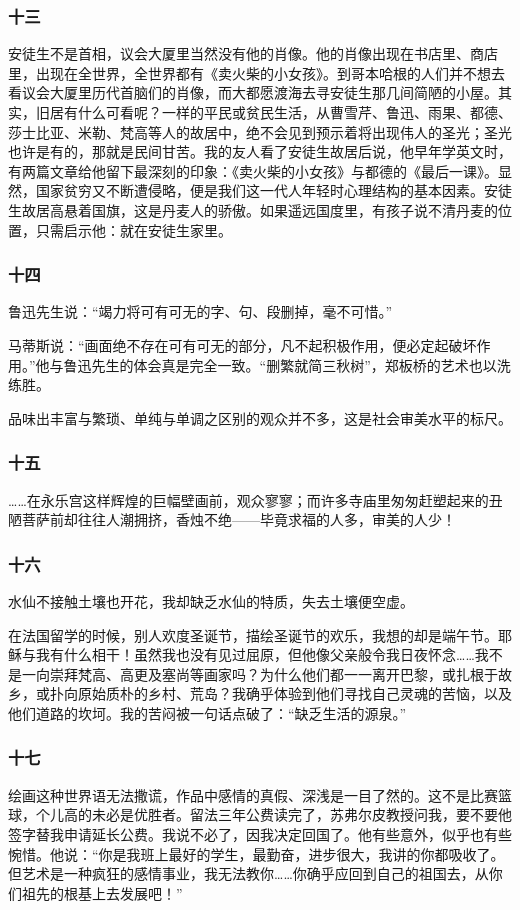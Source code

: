 \documentclass{article}
\begin{document}
\subsubsection{十三}
安徒生不是首相，议会大厦里当然没有他的肖像。他的肖像出现在书店里、商店里，出现在全世界，全世界都有《卖火柴的小女孩》。到哥本哈根的人们并不想去看议会大厦里历代首脑们的肖像，而大都愿渡海去寻安徒生那几间简陋的小屋。其实，旧居有什么可看呢？一样的平民或贫民生活，从曹雪芹、鲁迅、雨果、都德、莎士比亚、米勒、梵高等人的故居中，绝不会见到预示着将出现伟人的圣光；圣光也许是有的，那就是民间甘苦。我的友人看了安徒生故居后说，他早年学英文时，有两篇文章给他留下最深刻的印象：《卖火柴的小女孩》与都德的《最后一课》。显然，国家贫穷又不断遭侵略，便是我们这一代人年轻时心理结构的基本因素。安徒生故居高悬着国旗，这是丹麦人的骄傲。如果遥远国度里，有孩子说不清丹麦的位置，只需启示他：就在安徒生家里。
\subsubsection{十四}
鲁迅先生说：“竭力将可有可无的字、句、段删掉，毫不可惜。”

马蒂斯说：“画面绝不存在可有可无的部分，凡不起积极作用，便必定起破坏作用。”他与鲁迅先生的体会真是完全一致。“删繁就简三秋树”，郑板桥的艺术也以洗练胜。

品味出丰富与繁琐、单纯与单调之区别的观众并不多，这是社会审美水平的标尺。
\subsubsection{十五}
……在永乐宫这样辉煌的巨幅壁画前，观众寥寥；而许多寺庙里匆匆赶塑起来的丑陋菩萨前却往往人潮拥挤，香烛不绝——毕竟求福的人多，审美的人少！
\subsubsection{十六}
水仙不接触土壤也开花，我却缺乏水仙的特质，失去土壤便空虚。

在法国留学的时候，别人欢度圣诞节，描绘圣诞节的欢乐，我想的却是端午节。耶稣与我有什么相干！虽然我也没有见过屈原，但他像父亲般令我日夜怀念……我不是一向崇拜梵高、高更及塞尚等画家吗？为什么他们都一一离开巴黎，或扎根于故乡，或扑向原始质朴的乡村、荒岛？我确乎体验到他们寻找自己灵魂的苦恼，以及他们道路的坎坷。我的苦闷被一句话点破了：“缺乏生活的源泉。”
\subsubsection{十七}
绘画这种世界语无法撒谎，作品中感情的真假、深浅是一目了然的。这不是比赛篮球，个儿高的未必是优胜者。留法三年公费读完了，苏弗尔皮教授问我，要不要他签字替我申请延长公费。我说不必了，因我决定回国了。他有些意外，似乎也有些惋惜。他说：“你是我班上最好的学生，最勤奋，进步很大，我讲的你都吸收了。但艺术是一种疯狂的感情事业，我无法教你……你确乎应回到自己的祖国去，从你们祖先的根基上去发展吧！”
\end{document}

